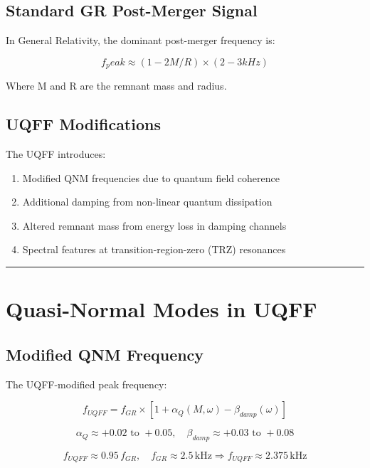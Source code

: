 \documentclass[12pt,a4paper]{article}
\begin{document}
\subsection{Standard GR Post-Merger Signal}

In General Relativity, the dominant post-merger frequency is:

\begin{equation}
f_peak \approx (1 - 2 M/R) \times (2-3 kHz)
\end{equation}

Where M and R are the remnant mass and radius.

\subsection{UQFF Modifications}

The UQFF introduces:

\begin{enumerate}
  \item Modified QNM frequencies due to quantum field coherence
  \item Additional damping from non-linear quantum dissipation
  \item Altered remnant mass from energy loss in damping channels
  \item Spectral features at transition-region-zero (TRZ) resonances
\end{enumerate}

\medskip\hrule\medskip

\section{Quasi-Normal Modes in UQFF}

\subsection{Modified QNM Frequency}

The UQFF-modified peak frequency:

\begin{equation}
f_{UQFF} = f_{GR} \times [1 + \alpha_Q(M,\omega) - \beta_{damp}(\omega)]
\end{equation}

\begin{equation}
\alpha_Q \approx +0.02\text{ to }+0.05,\quad \beta_{damp} \approx +0.03\text{ to }+0.08
\end{equation}

\begin{equation}
f_{UQFF} \approx 0.95\,f_{GR},\quad f_{GR} \approx 2.5\,\mathrm{kHz}\Rightarrow f_{UQFF} \approx 2.375\,\mathrm{kHz}
\end{equation}
\end{document}
